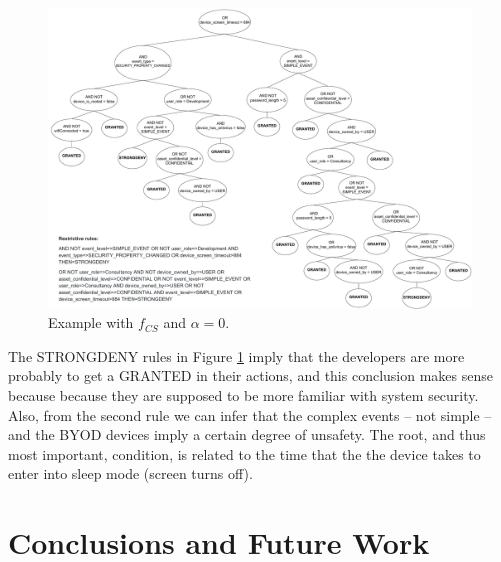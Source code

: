 \documentclass[runningheads]{llncs}
\begin{document}
\begin{figure}[h!tb]
	\centering
	\includegraphics[width=\textwidth]{img/bestInd_fCS_a0.pdf}
	\caption{Example with $f_{CS}$ and $\alpha=0$.} 
	\label{fig:bestInd_fCS_a0}
\end{figure}

The STRONGDENY rules in Figure \ref{fig:bestInd_fCS_a0} imply that
the developers are more probably to get a GRANTED in their actions,
and this conclusion makes sense because because they are supposed to
be more familiar with system security. Also, from the second rule we
can infer that the complex events -- not simple -- and the BYOD
devices imply a certain degree of unsafety. The root, and thus most
important, condition, is related to the time that the the device takes
to enter into sleep mode (screen turns off).



\section{Conclusions and Future Work}
\label{sec:future}
\end{document}
